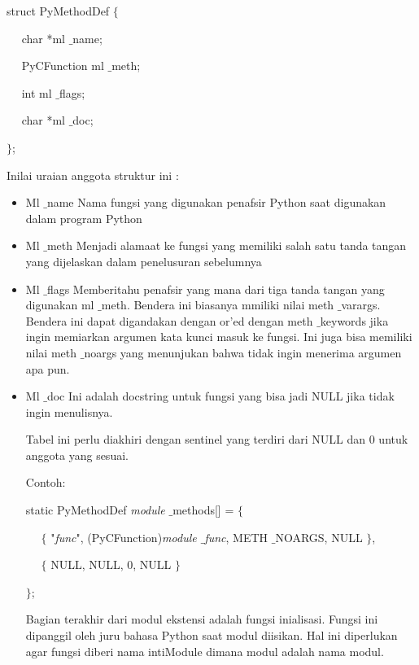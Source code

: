 struct PyMethodDef  $  \{  $ 
 
~~ char *ml $  \_  $name; 
 
~~ PyCFunction ml $  \_  $meth; 

~~ int ml $  \_  $flags; 
 
~~ char *ml $  \_  $doc; 

 $  \}  $; 
\vspace{12pt}

Inilai uraian anggota struktur ini : 

\begin{itemize}
\item Ml $  \_  $name 
Nama fungsi yang digunakan penafsir Python saat digunakan dalam program Python 

\item Ml $  \_  $meth 
Menjadi alamaat ke fungsi yang memiliki salah satu tanda tangan yang dijelaskan dalam penelusuran sebelumnya 

\item Ml $  \_  $flags 
Memberitahu penafsir yang mana dari tiga tanda tangan yang digunakan ml $  \_  $meth. Bendera ini biasanya mmiliki nilai meth $  \_  $varargs. Bendera ini dapat digandakan dengan or’ed dengan meth $  \_  $keywords jika ingin memiarkan argumen kata kunci masuk ke fungsi. Ini juga bisa memiliki nilai meth $  \_  $noargs yang menunjukan bahwa tidak ingin menerima argumen apa pun. 

\item Ml $  \_  $doc 
Ini adalah docstring untuk fungsi yang bisa jadi NULL jika tidak ingin menulisnya. 
\vspace{12pt}
\vspace{12pt}

 \hspace*{0.5in} Tabel ini perlu diakhiri dengan sentinel yang terdiri dari NULL dan 0 untuk anggota yang sesuai. 
\vspace{12pt}

Contoh: 

static PyMethodDef \textit{module} $  \_  $methods[] =  $  \{  $ 

~~  $  \{  $ "\textit{func}", (PyCFunction)\textit{module $  \_  $func}, METH $  \_  $NOARGS, NULL  $  \}  $, 

~~  $  \{  $ NULL, NULL, 0, NULL  $  \}  $ 

 $  \}  $; 
\vspace{12pt}

 \hspace*{0.5in} Bagian terakhir dari modul ekstensi adalah fungsi inialisasi. Fungsi ini dipanggil oleh juru bahasa Python saat modul diisikan. Hal ini diperlukan agar fungsi diberi nama intiModule dimana modul adalah nama modul. 


\end{itemize}
